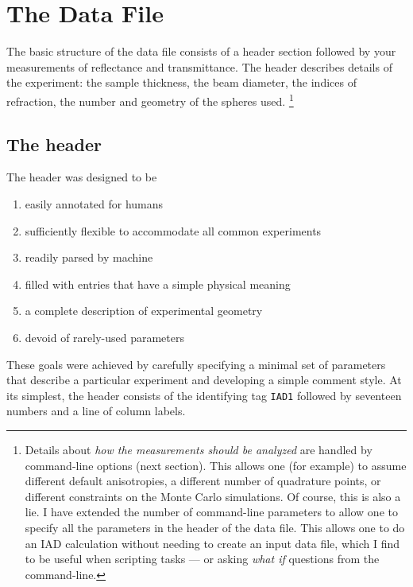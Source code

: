 \documentclass{article}
\begin{document}
\section{The Data File}

The basic structure of the data file consists of a header section followed by your
measurements of reflectance and transmittance.  The header describes
details of the experiment: the sample thickness, the beam diameter, the
indices of refraction, the number and geometry of the spheres used.%
\footnote{Details about \textit{how the measurements should be
analyzed} are handled by command-line options (next section).
This allows one (for example) to assume different default anisotropies, a different
number of quadrature points, or different constraints on the Monte Carlo
simulations.  Of course, this is also a lie.  I have extended the number
of command-line parameters to allow one to specify all the parameters in
the header of the data file.  This allows one to do an IAD calculation
without needing to create an input data file, which I find to be useful
when scripting tasks --- or asking \textit{what if} questions from the
command-line.} 


\subsection{The header}
The header was designed to be
\begin{enumerate}
\setlength{\itemsep}{0pt}
\item easily annotated for humans
\item sufficiently flexible to accommodate all common experiments
\item readily parsed by machine
\item filled with entries that have a simple physical meaning
\item a complete description of experimental geometry
\item devoid of rarely-used parameters
\end{enumerate}
These goals were achieved by carefully specifying a minimal set of
parameters that describe a particular experiment and developing a
simple comment style.  At its simplest, the header consists of the
identifying tag \texttt{IAD1} followed by seventeen numbers and a line of
column labels.
\end{document}
